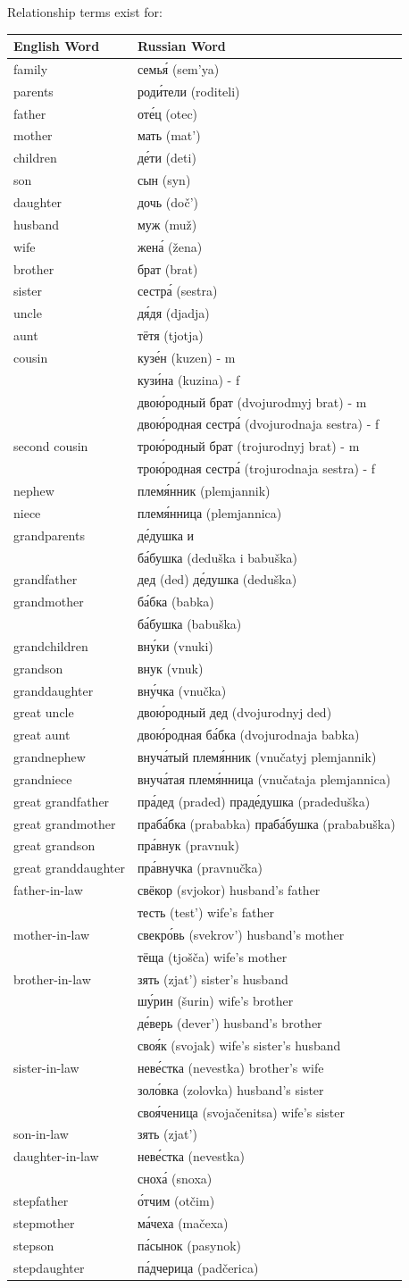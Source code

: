 \documentclass[
  a4paperpaper,
]{report}
\begin{document}
Relationship terms exist for:

\begin{longtable}[]{@{}ll@{}}
\toprule
English Word & Russian Word\tabularnewline
\midrule
\endhead
family & семья́ (sem'ya)\tabularnewline
parents & роди́тели (roditeli)\tabularnewline
father & оте́ц (otec)\tabularnewline
mother & мать (mat')\tabularnewline
children & де́ти (deti)\tabularnewline
son & сын (syn)\tabularnewline
daughter & дочь (doč')\tabularnewline
husband & муж (muž)\tabularnewline
wife & жена́ (žena)\tabularnewline
brother & брат (brat)\tabularnewline
sister & сестра́ (sestra)\tabularnewline
uncle & дя́дя (djadja)\tabularnewline
aunt & тётя (tjotja)\tabularnewline
cousin & кузе́н (kuzen) - m\tabularnewline
& кузи́на (kuzina) - f\tabularnewline
& двою́родный брат (dvojurodmyj brat) - m\tabularnewline
& двою́родная сестра́ (dvojurodnaja sestra) - f\tabularnewline
second cousin & трою́родный брат (trojurodnyj brat) - m\tabularnewline
& трою́родная сестра́ (trojurodnaja sestra) - f\tabularnewline
nephew & племя́нник (plemjannik)\tabularnewline
niece & племя́нница (plemjannica)\tabularnewline
grandparents & де́душка и\tabularnewline
& ба́бушка (deduška i babuška)\tabularnewline
grandfather & дед (ded) де́душка (deduška)\tabularnewline
grandmother & ба́бка (babka)\tabularnewline
& ба́бушка (babuška)\tabularnewline
grandchildren & вну́ки (vnuki)\tabularnewline
grandson & внук (vnuk)\tabularnewline
granddaughter & вну́чка (vnučka)\tabularnewline
great uncle & двою́родный дед (dvojurodnyj ded)\tabularnewline
great aunt & двою́родная ба́бка (dvojurodnaja babka)\tabularnewline
grandnephew & внуча́тый племя́нник (vnučatyj plemjannik)\tabularnewline
grandniece & внуча́тая племя́нница (vnučataja plemjannica)\tabularnewline
great grandfather & пра́дед (praded) праде́душка
(pradeduška)\tabularnewline
great grandmother & праба́бка (prababka) праба́бушка
(prababuška)\tabularnewline
great grandson & пра́внук (pravnuk)\tabularnewline
great granddaughter & пра́внучка (pravnučka)\tabularnewline
father-in-law & свёкор (svjokor) husband's father\tabularnewline
& тесть (test') wife's father\tabularnewline
mother-in-law & свекро́вь (svekrov') husband's mother\tabularnewline
& тёща (tjošča) wife's mother\tabularnewline
brother-in-law & зять (zjat') sister's husband\tabularnewline
& шу́рин (šurin) wife's brother\tabularnewline
& де́верь (dever') husband's brother\tabularnewline
& своя́к (svojak) wife's sister's husband\tabularnewline
sister-in-law & неве́стка (nevestka) brother's wife\tabularnewline
& золо́вка (zolovka) husband's sister\tabularnewline
& своя́ченица (svojačenitsa) wife's sister\tabularnewline
son-in-law & зять (zjat')\tabularnewline
daughter-in-law & неве́стка (nevestka)\tabularnewline
& сноха́ (snoxa)\tabularnewline
stepfather & о́тчим (otčim)\tabularnewline
stepmother & ма́чеха (mačexa)\tabularnewline
stepson & па́сынок (pasynok)\tabularnewline
stepdaughter & па́дчерица (padčerica)\tabularnewline
\bottomrule
\end{longtable}
\end{document}

